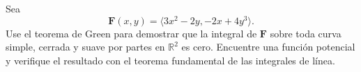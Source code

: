 Sea
\[
\mathbf{F}(x,y)=\langle3x^2-2y,-2x+4y^3\rangle.
\]
Use el teorema de Green para demostrar que la integral de $\mathbf{F}$ sobre toda curva simple, cerrada y suave por partes en $\mathbb R^2$ es cero. Encuentre una función potencial y verifique el resultado con el teorema fundamental de las integrales de línea.

